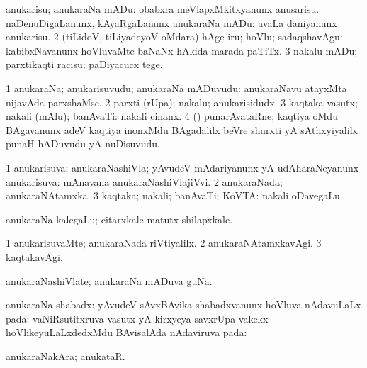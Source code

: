 \bentry
{}
\gl{\sakirx}
\bmng
\bnum
{} anukarisu; anukaraNa mADu: 
\banum
{} obabxra meVlapxMkitxyanunx anusarisu. 
 naDenuDigaLanunx, kAyaRgaLanunx anukaraNa mADu:  avaLa daniyanunx anukarisu. 
\eanum
\numie
\num{2} (tiLidoV, tiLiyadeyoV oMdara) hAge iru; hoVlu; sadaqshavAgu:  kabibxNavanunx hoVluvaMte baNaNx hAkida marada paTiTx. 
\num{3} nakalu mADu; parxtikaqti racisu; paDiyacucx tege. 
\enum
\emng
\eentry

\bentry
{}
\gl{\nA}
\bmng
\bnum
\num{1} anukaraNa; anukarisuvudu; anukaraNa mADuvudu:  anukaraNavu atayxMta nijavAda parxshaMse. 
\num{2} parxti (rUpa); nakalu; anukarisidudx. 
\num{3} kaqtaka vasutx; nakali (mAlu); banAvaTi:  nakali cinanx. 
\num{4} (\saM) punarAvataRne; kaqtiya oMdu BAgavanunx adeV kaqtiya inonxMdu BAgadalilx beVre shurxti yA sAthxyiyalilx punaH hADuvudu yA nuDisuvudu. 
\enum
\emng
\eentry

\bentry
{}
\gl{\gu}
\bmng
\bnum
\num{1} anukarisuva; anukaraNashiVla; yAvudeV mAdariyanunx yA udAharaNeyanunx anukarisuva:  mAnavana anukaraNashiVlajiVvi. 
\num{2} anukaraNada; anukaraNAtamxka. 
\num{3} kaqtaka; nakali; banAvaTi; KoVTA:  nakali oDavegaLu. 
\enum
\emng
\eentry

\bentry
{}
\gl{\nA}
\bmng
anukaraNa kalegaLu; citarxkale matutx shilapxkale. 
\emng
\eentry

\bentry
{}
\gl{\kirxvi}
\bmng
\bnum
\num{1} anukarisuvaMte; anukaraNada riVtiyalilx. 
\num{2} anukaraNAtamxkavAgi. 
\num{3} kaqtakavAgi. 
\enum
\emng
\eentry

\bentry
{}
\gl{\nA}
\bmng
anukaraNashiVlate; anukaraNa mADuva guNa. 
\emng
\eentry

\bentry
{}
\gl{\nA}
\bmng
anukaraNa shabadx: 
\banum
{} yAvudeV sAvxBAvika shabadxvanunx hoVluva nAdavuLaLx pada:  
 vaNiRsutitxruva vasutx yA kirxyeya savxrUpa \mo vakekx hoVlikeyuLaLxdedxMdu BAvisalAda nAdaviruva pada:  
\eanum
\emng
\eentry

\bentry
{}
\gl{\nA}
\bmng
anukaraNakAra; anukataR. 
\emng
\eentry

